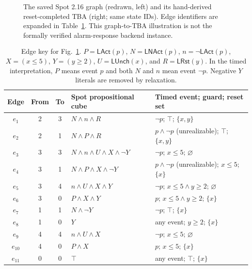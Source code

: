 \begin{figure}[!t]
\centering
\resizebox{\textwidth}{!}{}
\caption{The saved Spot 2.16 graph (redrawn, left) and its hand-derived
reset-completed TBA (right; same state IDs). Edge identifiers are expanded in
Table~\ref{tab:worked-translation-edges}. This graph-to-TBA illustration is
not the formally verified alarm-response backend instance.}
\label{fig:translation-steps45}
\end{figure}

\begin{table}[!t]
\centering
\caption{Edge key for Fig.~\ref{fig:translation-steps45}. $P=\mathsf{LAct}(p)$,
$N=\mathsf{LNAct}(p)$, $n=\neg\mathsf{LAct}(p)$, $X=(x\le5)$,
$Y=(y\ge2)$, $U=\mathsf{LUnch}(x)$, and $R=\mathsf{LRst}(y)$. In the
timed interpretation, $P$ means event $p$ and both $N$ and $n$ mean event
$\neg p$. Negative $Y$ literals are removed by relaxation.}
\label{tab:worked-translation-edges}
\footnotesize
\begin{tabular}{@{}c c c p{} p{}@{}}
\toprule
Edge & From & To & Spot propositional cube & Timed event; guard; reset set\\
\midrule
$e_1$ & 2 & 3 & $N\land n\land R$ & $\neg p$; $\top$; $\{x,y\}$\\
$e_2$ & 2 & 1 & $N\land P\land R$ & $p\land\neg p$ (unrealizable); $\top$; $\{x,y\}$\\
$e_3$ & 3 & 3 & $N\land n\land U\land X\land\neg Y$ & $\neg p$; $x\le5$; $\varnothing$\\
$e_4$ & 3 & 1 & $N\land P\land X\land\neg Y$ & $p\land\neg p$ (unrealizable); $x\le5$; $\{x\}$\\
$e_5$ & 3 & 4 & $n\land U\land X\land Y$ & $\neg p$; $x\le5\land y\ge2$; $\varnothing$\\
$e_6$ & 3 & 0 & $P\land X\land Y$ & $p$; $x\le5\land y\ge2$; $\{x\}$\\
$e_7$ & 1 & 1 & $N\land\neg Y$ & $\neg p$; $\top$; $\{x\}$\\
$e_8$ & 1 & 0 & $Y$ & any event; $y\ge2$; $\{x\}$\\
$e_9$ & 4 & 4 & $n\land U\land X$ & $\neg p$; $x\le5$; $\varnothing$\\
$e_{10}$ & 4 & 0 & $P\land X$ & $p$; $x\le5$; $\{x\}$\\
$e_{11}$ & 0 & 0 & $\top$ & any event; $\top$; $\{x\}$\\
\bottomrule
\end{tabular}
\end{table}
